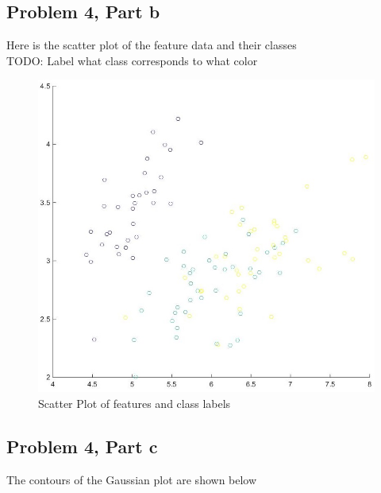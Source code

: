 \documentclass[11pt,psfig]{article}
\begin{document}
\newpage

\subsection*{Problem 4, Part b}

Here is the scatter plot of the feature data and their classes\\
TODO: Label what class corresponds to what color

\begin{figure}[H]
\centering
\includegraphics[width=\columnwidth]{prob4bScatter.jpg}
\caption{Scatter Plot of features and class labels}
\end{figure}

\newpage

\subsection*{Problem 4, Part c}

The contours of the Gaussian plot are shown below\\
\end{document}
